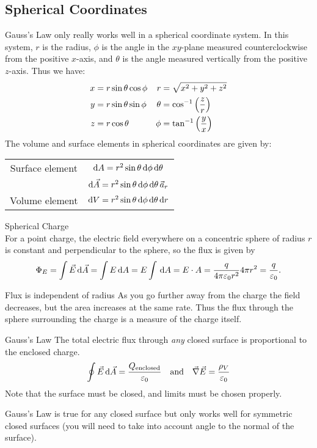 \documentclass[class=article, crop=false]{standalone}
\begin{document}
  \subsection{Spherical Coordinates}
  Gauss's Law only really works well in a spherical coordinate system. In this system, $r$ is the radius, $\phi$ is the angle in the $xy$-plane measured counterclockwise from the positive $x$-axis, and $\theta$ is the angle measured vertically from the positive $z$-axis. Thus we have:
  \begin{align*}
    x &= r\sin\theta\cos\phi & r &= \sqrt{x^2 + y^2 + z^2} \\
    y &= r\sin\theta\sin\phi & \theta &= \cos^{-1} \left( \frac{z}{r} \right) \\
    z &= r\cos\theta & \phi &= \tan^{-1} \left( \frac{y}{x} \right)
  \end{align*}
  The volume and surface elements in spherical coordinates are given by:
  \begin{center}\begin{tabular}{c|c}
    Surface element & $\mathrm{d}A = r^2\sin\theta \,\mathrm{d}\phi\,\mathrm{d}\theta$\\
                    & $\mathrm{d}\vec{A} = r^2\sin\theta \,\mathrm{d}\phi\,\mathrm{d}\theta\,\vec{a}_r$ \\
    \hline
    Volume element & $\mathrm{d}V = r^2\sin\theta \,\mathrm{d}\phi\,\mathrm{d}\theta\,\mathrm{d}r$
  \end{tabular}\end{center}
  \begin{example}{Spherical Charge} \\
    For a point charge, the electric field everywhere on a concentric sphere of radius $r$ is constant and perpendicular to the sphere, so the flux is given by
    \[
      \Phi_E = \int \vec{E} \,\mathrm{d}\vec{A} = \int E \,\mathrm{d}A = E\int \,\mathrm{d}A = E\cdot A = \frac{q}{4\pi\varepsilon_0 r^2}4\pi r^2 = \frac{q}{\varepsilon_0}.
    \]
  \end{example}
  \begin{note}{Flux is independent of radius}
    As you go further away from the charge the field decreases, but the area increases at the same rate. Thus the flux through the sphere surrounding the charge is a measure of the charge itself.
  \end{note}
  \begin{theorem}{Gauss's Law}
    The total electric flux through \emph{any} closed surface is proportional to the enclosed charge.
    \[
      \oint \vec{E} \,\mathrm{d}\vec{A} = \frac{Q_{\text{enclosed}}}{\varepsilon_0}\quad \text{and}\quad \vec{\nabla}\vec{E} = \frac{\rho_V}{\varepsilon_0}
    \]
    Note that the surface must be closed, and limits must be chosen properly.
  \end{theorem}
  Gauss's Law is true for any closed surface but only works well for symmetric closed surfaces (you will need to take into account angle to the normal of the surface).
\end{document}
